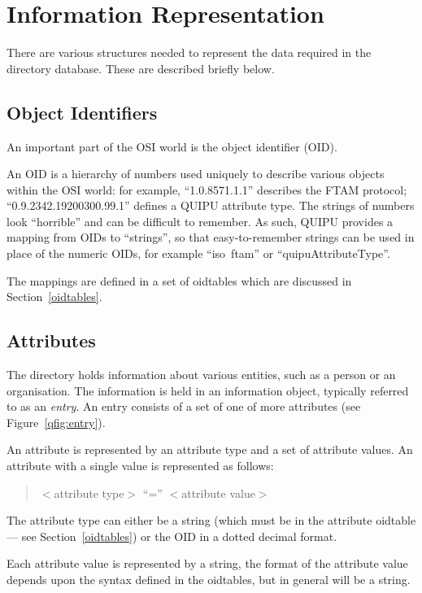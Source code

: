 \section{Information Representation}
\label{attributes}
There are various structures needed to represent the data required in the
directory database. These are described
briefly below.

\subsection {Object Identifiers}
An important part of the OSI world is the object identifier (OID).

An OID is a hierarchy of numbers used uniquely to describe various objects
within the OSI world: for example, ``1.0.8571.1.1'' describes the FTAM
protocol; ``0.9.2342.19200300.99.1'' 
defines a QUIPU attribute type.
The strings of numbers look ``horrible'' and can be difficult to remember.
As such, QUIPU provides a mapping from OIDs to ``strings'', so that 
easy-to-remember strings can be used in place of the numeric OIDs, for
example ``iso~ftam'' or ``quipuAttributeType''.

The mappings are defined in a set of oidtables which are discussed
in Section~\ref{oidtables}. 

\subsection {Attributes}


The directory holds information about various entities, such as a person or
an organisation.  The information is held in an information object,
typically referred to as an {\em entry}. 
An entry consists of a set of one of more attributes
(see Figure~\ref{qfig:entry}).

An attribute is represented by an attribute type and a set of attribute values.
An attribute with a single value is represented as follows:
\begin{quote}	
$<$attribute type$>$ ``='' $<$attribute value$>$
\end{quote}
The attribute type can either be a string (which must be in the attribute
oidtable --- see Section~\ref{oidtables}) or the OID in a dotted decimal
format.

Each attribute value is represented by a string, the format of the attribute value
depends upon the
syntax defined in the oidtables, but in general will be a string.

